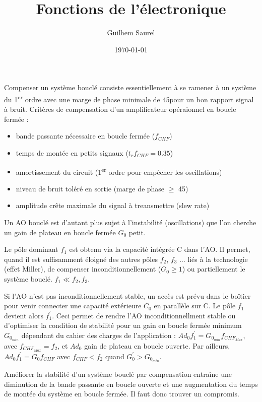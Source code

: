 \documentclass[10pt,a4paper]{article}
\title{Fonctions de l'électronique}
\date{\today}
\author{Guilhem Saurel}
\begin{document}

Compenser un système bouclé consiste essentiellement à se ramener à un système du 1\textsuperscript{er} ordre avec une marge de phase minimale de 45\degres pour un bon rapport signal à bruit. Critères de compensation d'un amplificateur opéraionnel en boucle fermée : 
\begin{itemize}
    \item bande passante nécessaire en boucle fermée ($f_{CHF}$)
    \item temps de montée en petits signaux ($t_r f_{CHF} = 0.35$)
    \item amortissement du circuit (1\textsuperscript{er} ordre pour empêcher les oscillations)
    \item niveau de bruit toléré en sortie (marge de phase $\geq$ 45\degres)
    \item amplitude crête maximale du signal à treansmettre (slew rate)
\end{itemize}

Un AO bouclé est d'autant plus sujet à l'instabilité (oscillations) que l'on cherche un gain de plateau en boucle fermée $G_0$ petit.

Le pôle dominant $f_1$ est obtenu via la capacité intégrée C dans l'AO. Il permet, quand il est suffisamment éloigné des autres pôles $f_2$, $f_3$ ... liés à la technologie (effet Miller), de compenser inconditionnellement ($G_0 \geq 1$) ou partiellement le système bouclé. $f_1 \ll f_2, f_3$.

Si l'AO n'est pas inconditionnellement stable, un accès est prévu dans le boîtier pour venir connecter une capacité extérieure $C_0$ en parallèle sur C. Le pôle $f_1$ devient alors $f_1^\prime$. Ceci permet de rendre l'AO inconditionnellment stable ou d'optimiser la condition de stabilité pour un gain en boucle fermée minimum $G_{0_{min}}$ dépendant du cahier des charges de l'application : $Ad_0 f_1^\prime = G_{0_{min}} f_{CHF_{Max}}$, avec $f_{CHF_{Max}} = f_2$, et $Ad_0$ gain de plateau en boucle ouverte. Par ailleurs, $Ad_0 f_1^\prime = G_0 f_{CHF}$ avec $f_{CHF} < f_2$ quand $G_0^\prime > G_{0_{min}}$.

Améliorer la stabilité d'un système bouclé par compensation entraîne une diminution de la bande passante en boucle ouverte et une augmentation du temps de montée du système en boucle fermée. Il faut donc trouver un compromis.
\end{document}
